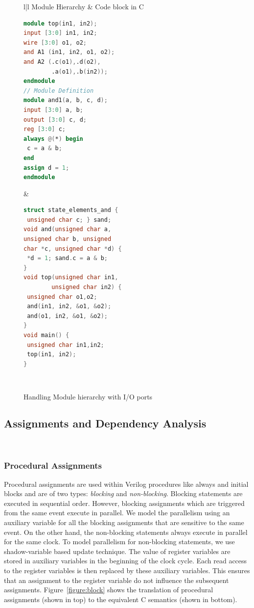 \begin{figure}[htbp]
\scriptsize
\centering
\begin{tabular}{l|l}
\hline
Module Hierarchy &  Code block in C \\
\hline
\begin{lstlisting}[mathescape=true,language=Verilog]
module top(in1, in2);
input [3:0] in1, in2;
wire [3:0] o1, o2;
and A1 (in1, in2, o1, o2);
and A2 (.c(o1),.d(o2),
        .a(o1),.b(in2));
endmodule
// Module Definition              
module and1(a, b, c, d);
input [3:0] a, b;
output [3:0] c, d;
reg [3:0] c;
always @(*) begin
 c = a & b;
end
assign d = 1;
endmodule
\end{lstlisting}
&
\begin{lstlisting}[mathescape=true,language=C]
struct state_elements_and {
 unsigned char c; } sand;
void and(unsigned char a, 
unsigned char b, unsigned 
char *c, unsigned char *d) {
 *d = 1; sand.c = a & b;
}
void top(unsigned char in1, 
        unsigned char in2) {
 unsigned char o1,o2;
 and(in1, in2, &o1, &o2);
 and(o1, in2, &o1, &o2);
}
void main() {
 unsigned char in1,in2;
 top(in1, in2);
}    
\end{lstlisting}
\\
\hline
\end{tabular}
\caption{Handling Module hierarchy with I/O ports}
\label{figure:module-hierarchy}
\end{figure}

\subsection{Assignments and Dependency Analysis}~\label{sec:dep}

\subsubsection{Procedural Assignments}
%
Procedural assignments are used within Verilog 
procedures like always and initial blocks and are of 
two types: \emph{blocking} and \emph{non-blocking}.  
Blocking statements are executed in sequential order. However, blocking
assignments which are triggered from the same event execute
in parallel.  We model the parallelism using an auxiliary variable
for all the blocking assignments that are sensitive to the same event. 
On the other hand, the non-blocking statements always 
execute in parallel for the same clock. To model 
parallelism for non-blocking statements, we 
use shadow-variable based update technique. 
The value of register variables are stored in 
auxiliary variables in the beginning of the clock cycle.  
Each read access to the register variables is then replaced 
by these auxiliary variables. This ensures that 
an assignment to the register variable do not influence the 
subsequent assignments. Figure~\ref{figure:block} shows 
the translation of procedural assignments (shown in top) to 
the equivalent C semantics (shown in bottom).     

